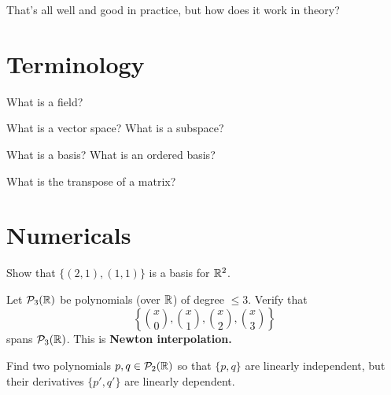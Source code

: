 \documentclass{homework}
\author{Jim Fowler}
\begin{document}
\maketitle

\begin{inspiration}
That's all well and good in practice, but how does it work in theory?
\end{inspiration}

\section{Terminology}

\begin{problem}
  What is a field?
\end{problem}

\begin{problem}
  What is a vector space?  What is a subspace?
\end{problem}

\begin{problem}
  What is a basis?  What is an ordered basis?
\end{problem}

\begin{problem} %
  What is the transpose of a matrix?
\end{problem}

\section{Numericals}

\begin{problem}
  Show that $\{ (2,1), (1,1) \}$ is a basis for $\mathbb{R}^2$.
\end{problem}

\begin{problem}\label{newton-interpolation}
  Let $\mathcal{P}_{3}(\mathbb{R})$ be polynomials (over $\mathbb{R}$) of degree $\leq 3$.  Verify that
  \[ \left\{ \binom{x}{0}, \binom{x}{1}, \binom{x}{2}, \binom{x}{3} \right\} \]
  spans $\mathcal{P}_{3}(\mathbb{R})$.  This is \textbf{Newton interpolation.}
\end{problem}

\begin{problem}
  Find two polynomials $p,q \in \mathcal{P}_{2}(\mathbb{R})$ so that $\{p,q\}$ are linearly independent, but their derivatives $\{p',q'\}$ are linearly dependent.
\end{problem}
\end{document}
